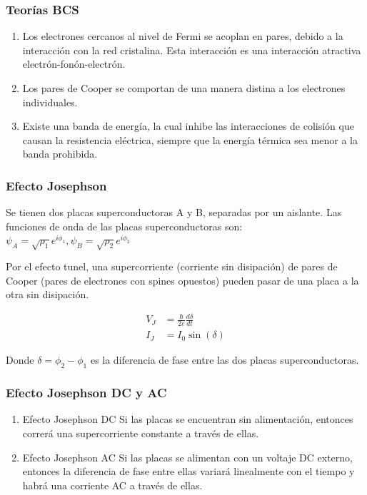 \documentclass[xetex,mathserif,serif]{beamer}
\begin{document}
\begin{frame}
    \frametitle{Teorías BCS}

    \begin{enumerate}
        \item Los electrones cercanos al nivel de Fermi se acoplan en pares, debido a la interacción con la red cristalina. Esta interacción es una interacción atractiva electrón-fonón-electrón.
        \item Los pares de Cooper se comportan de una manera distina a los electrones individuales.
        \item Existe una banda de energía, la cual inhibe las interacciones de colisión que causan la resistencia eléctrica, siempre que la energía térmica sea menor a la banda prohibida.
    \end{enumerate}

\end{frame}

\begin{frame}
    \frametitle{Efecto Josephson}

    \justify
    Se tienen dos placas superconductoras A y B, separadas por un aislante. Las funciones de onda de las placas superconductoras son:
    $\psi_A = \sqrt{\rho_1} e^{i \phi_1}, \psi_B = \sqrt{\rho_2} e^{i \phi_2}$ 

    \justify
    Por el efecto tunel, una supercorriente (corriente sin disipación) de pares de Cooper (pares de electrones con spines opuestos) pueden pasar de una placa a la otra sin disipación.

    \begin{align}
        V_J &= \frac{\hbar}{2e} \frac{d\delta}{dt} \\
        I_J &= I_0 \sin(\delta)
    \end{align}

    \justify
    Donde $\delta=\phi_2-\phi_1$ es la diferencia de fase entre las dos placas superconductoras.

\end{frame}

\begin{frame}
    \frametitle{Efecto Josephson DC y AC}

    \begin{enumerate}
        \item Efecto Josephson DC
            Si las placas se encuentran sin alimentación, entonces correrá una supercorriente constante a través de ellas.

        \item Efecto Josephson AC
            Si las placas se alimentan con un voltaje DC externo, entonces la diferencia de fase entre ellas variará linealmente con el tiempo y habrá una corriente AC
a través de ellas.
    \end{enumerate}

\end{frame}
\end{document}
